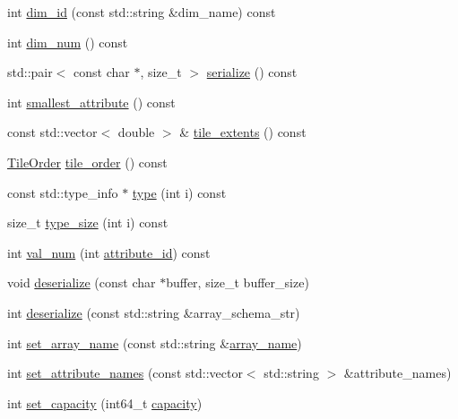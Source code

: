 \begin{DoxyCompactItemize}
\item 
int \hyperlink{classArraySchema_aabb42471b0b8bbd3d15e2445f5a032bf}{dim\+\_\+id} (const std\+::string \&dim\+\_\+name) const 
\item 
int \hyperlink{classArraySchema_a91ec1db538a6e5a6112e6db5ea166f78}{dim\+\_\+num} () const 
\item 
std\+::pair$<$ const char $\ast$, size\+\_\+t $>$ \hyperlink{classArraySchema_a197c139ac6fe6ded071f5028c66c90d5}{serialize} () const 
\item 
int \hyperlink{classArraySchema_a92783b77c5a306573638e858a2bf4c2b}{smallest\+\_\+attribute} () const 
\item 
const std\+::vector$<$ double $>$ \& \hyperlink{classArraySchema_a8bb97e1ed6aa142aa35fa446a413d698}{tile\+\_\+extents} () const 
\item 
\hyperlink{classArraySchema_ae9240847f83a545b7de651f032ffde63}{Tile\+Order} \hyperlink{classArraySchema_a644e0d03963cae3528456c9cfd0ad13d}{tile\+\_\+order} () const 
\item 
const std\+::type\+\_\+info $\ast$ \hyperlink{classArraySchema_aaefeb9290be56acd84c2e1316c39da38}{type} (int i) const 
\item 
size\+\_\+t \hyperlink{classArraySchema_a9352df0a7ad1e4343ce4b13017ef0084}{type\+\_\+size} (int i) const 
\item 
int \hyperlink{classArraySchema_ad9132dbb5ad3c838df5750b3e1c71075}{val\+\_\+num} (int \hyperlink{classArraySchema_ad4c1390866e3dc27b6487b703aadddb1}{attribute\+\_\+id}) const 
\item 
void \hyperlink{classArraySchema_a54180b37c37e2262f6131788667cf0b0}{deserialize} (const char $\ast$buffer, size\+\_\+t buffer\+\_\+size)
\item 
int \hyperlink{classArraySchema_af2044e56ddd717cb0d11984ed1eb50a3}{deserialize} (const std\+::string \&array\+\_\+schema\+\_\+str)
\item 
int \hyperlink{classArraySchema_a806d1fc54221d51a394f8ed3c2d11f56}{set\+\_\+array\+\_\+name} (const std\+::string \&\hyperlink{classArraySchema_ae6df338bba60ba3eae504b4643607778}{array\+\_\+name})
\item 
int \hyperlink{classArraySchema_a78daf8d6dd7b1ffea64652acfa11cc29}{set\+\_\+attribute\+\_\+names} (const std\+::vector$<$ std\+::string $>$ \&attribute\+\_\+names)
\item 
int \hyperlink{classArraySchema_aa0a52ef1e87a28bc68d7f5b60b823894}{set\+\_\+capacity} (int64\+\_\+t \hyperlink{classArraySchema_ae438b6a084ea3b363fe51d555f5af746}{capacity})

\end{DoxyCompactItemize}
